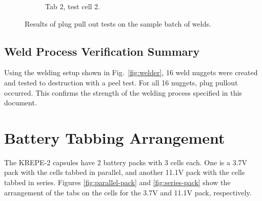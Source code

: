 \documentclass{article}
\begin{document}
\begin{figure}[H]
\begin{subfigure}{0.3\textwidth}
\caption{Tab 2, test cell 2.}
\label {fig:peel-4}
\end{subfigure}
\caption{Results of plug pull out tests on the sample batch of welds.}
\end{figure}

\subsection{Weld Process Verification Summary}
Using the welding setup shown in Fig.~\ref{fig:welder}, 16 weld nuggets were created and tested to destruction with a peel test. For all 16 nuggets, plug pullout occurred. This confirms the strength of the welding process specified in this document.

\section{Battery Tabbing Arrangement}

The KREPE-2 capsules have 2 battery packs with 3 cells each. One is a 3.7V pack with the cells tabbed in parallel, and another 11.1V pack with the cells tabbed in series. Figures \ref{fig:parallel-pack} and \ref{fig:series-pack} show the arrangement of the tabs on the cells for the 3.7V and 11.1V pack, respectively.
\end{document}
